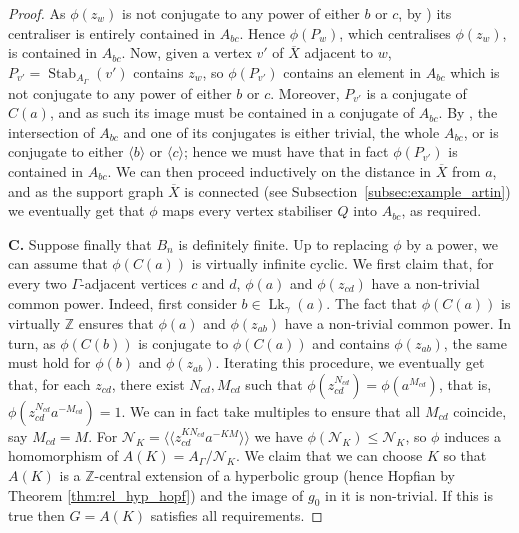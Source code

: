 \documentclass[svgnames]{amsart}
\theoremstyle{plain}
\theoremstyle{definition}
\newcommand{\Z}{\mathbb{Z}}
\newcommand{\ov}[1]{\overline{#1}}
\newcommand{\link}{\operatorname{Lk}}
\newcommand{\Stab}[2]{\operatorname{Stab}_{#1}(#2)}
\begin{document}
\begin{proof}
As $\phi(z_w)$ is not conjugate to any power of either $b$ or $c$, by \cite[Remark 3.6]{MV:centralisers}) its centraliser is entirely contained in $A_{bc}$. Hence $\phi(P_w)$, which centralises $\phi(z_w)$, is contained in $A_{bc}$. Now, given a vertex $v'$ of $\ov X$ adjacent to $w$, $P_{v'}=\Stab{A_\Gamma}{v'}$ contains $z_w$, so $\phi(P_{v'})$ contains an element in $A_{bc}$ which is not conjugate to any power of either $b$ or $c$. Moreover, $P_{v'}$ is a conjugate of $C(a)$, and as such its image must be contained in a conjugate of $A_{bc}$. By \cite[Theorem A]{CMV:parabolics}, the intersection of $A_{bc}$ and one of its conjugates is either trivial, the whole $A_{bc}$, or is conjugate to either $\langle b\rangle$ or $\langle c\rangle$; hence we must have that in fact $\phi(P_{v'})$ is contained in $A_{bc}$. We can then proceed inductively on the distance in $\ov{X}$ from $a$, and as the support graph $\ov X$ is connected (see Subsection~\ref{subsec:example_artin}) we eventually get that $\phi$ maps every vertex stabiliser $Q$ into $A_{bc}$, as required.
\par\medskip
\textbf{C.} Suppose finally that $B_n$ is definitely finite. Up to replacing $\phi$ by a power, we can assume that $\phi(C(a))$ is virtually infinite cyclic. We first claim that, for every two $\Gamma$-adjacent vertices $c$ and $d$, $\phi(a)$ and $\phi(z_{cd})$ have a non-trivial common power. Indeed, first consider $b\in \link_\gamma(a)$. The fact that $\phi(C(a))$ is virtually $\Z$ ensures that $\phi(a)$ and $\phi(z_{ab})$ have a non-trivial common power. In turn, as $\phi(C(b))$ is conjugate to $\phi(C(a))$ and contains $\phi(z_{ab})$, the same must hold for $\phi(b)$ and $\phi(z_{ab})$. Iterating this procedure, we eventually get that, for each $z_{cd}$, there exist $N_{cd},M_{cd}$ such that $\phi(z_{cd}^{N_{cd}})=\phi(a^{M_{cd}})$, that is, $\phi(z_{cd}^{N_{cd}}a^{-M_{cd}})=1$.  We can in fact take multiples to ensure that all $M_{cd}$ coincide, say $M_{cd}=M$. For $\mathcal N_K=\langle\langle z_{cd}^{KN_{cd}}a^{-KM}\rangle\rangle$ we have $\phi(\mathcal N_K)\le\mathcal N_K$, so $\phi$ induces a homomorphism of $A(K)=A_\Gamma/\mathcal N_K$. We claim that we can choose $K$ so that $A(K)$ is a $\Z$-central extension of a hyperbolic group (hence Hopfian by Theorem \ref{thm:rel_hyp_hopf}) and the image of $g_0$ in it is non-trivial. If this is true then $G=A(K)$ satisfies all requirements.


\end{proof}
\end{document}
